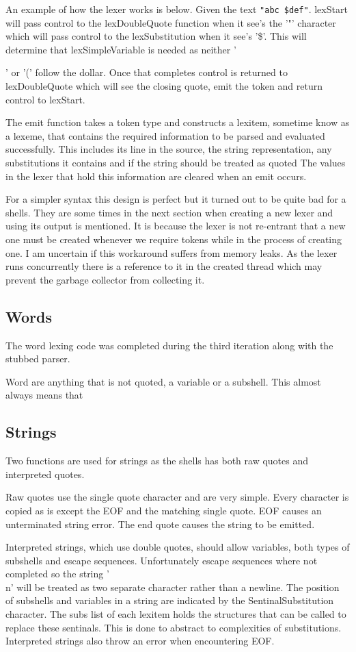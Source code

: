 An example of how the lexer works is below.
Given the text \verb!"abc $def"!.
lexStart will pass control to the lexDoubleQuote function when it see's the '"' character which will pass control to the lexSubstitution when it see's '\$'.
This will determine that lexSimpleVariable is needed as neither '{' or '(' follow the dollar.
Once that completes control is returned to lexDoubleQuote which will see the closing quote, emit the token and return control to lexStart.

The emit function takes a token type and constructs a lexitem, sometime know as a lexeme, that contains the required information to be parsed and evaluated successfully.
This includes its line in the source, the string representation, any substitutions it contains and if the string should be treated as quoted
The values in the lexer that hold this information are cleared when an emit occurs.

For a simpler syntax this design is perfect but it turned out to be quite bad for a shells.
They are some times in the next section when creating a new lexer and using its output is mentioned.
It is because the lexer is not re-entrant that a new one must be created whenever we require tokens while in the process of creating one.
I am uncertain if this workaround suffers from memory leaks.
As the lexer runs concurrently there is a reference to it in the created thread which may prevent the garbage collector from collecting it.

\subsection{Words}
The word lexing code was completed during the third iteration along with the stubbed parser.

Word are anything that is not quoted, a variable or a subshell.
This almost always means that

\subsection{Strings}
Two functions are used for strings as the shells has both raw quotes and interpreted quotes.

Raw quotes use the single quote character and are very simple.
Every character is copied as is except the EOF and the matching single quote.
EOF causes an unterminated string error.
The end quote causes the string to be emitted.

Interpreted strings, which use double quotes, should allow variables, both types of subshells and escape sequences.
Unfortunately escape sequences where not completed so the string '\\n' will be treated as two separate character rather than a newline.
The position of subshells and variables in a string are indicated by the SentinalSubstitution character.
The subs list of each lexitem holds the structures that can be called to replace these sentinals.
This is done to abstract to complexities of substitutions.
Interpreted strings also throw an error when encountering EOF.

}
